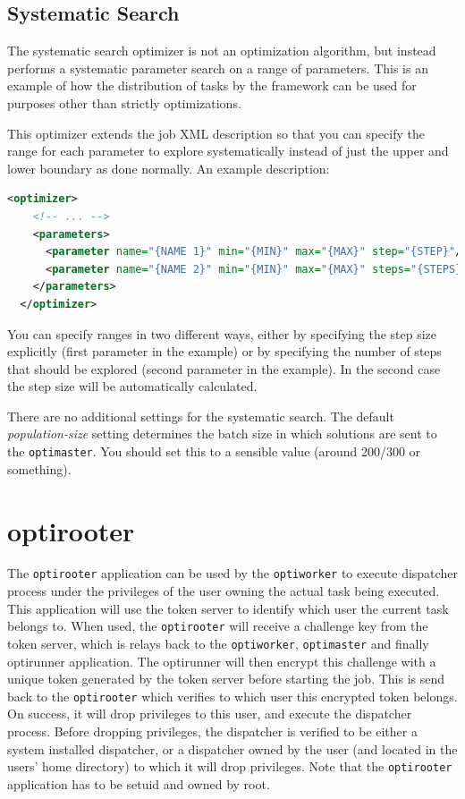 \documentclass{report}
\begin{document}
\subsection{Systematic Search}
The systematic search optimizer is not an optimization algorithm, but instead
performs a systematic parameter search on a range of parameters. This is an
example of how the distribution of tasks by the framework can be used for
purposes other than strictly optimizations.

This optimizer extends the job XML description so that you can specify the
range for each parameter to explore systematically instead of just the upper
and lower boundary as done normally. An example description:

\begin{lstlisting}[language=xml]
  <optimizer>
    <!-- ... -->
    <parameters>
      <parameter name="{NAME 1}" min="{MIN}" max="{MAX}" step="{STEP}"/>
      <parameter name="{NAME 2}" min="{MIN}" max="{MAX}" steps="{STEPS}"/>
    </parameters>
  </optimizer>
\end{lstlisting}

You can specify ranges in two different ways, either by specifying the step
size explicitly (first parameter in the example) or by specifying the number of
steps that should be explored (second parameter in the example). In the second case
the step size will be automatically calculated.

There are no additional settings for the systematic search. The default
\textit{population-size} setting determines the batch size in which
solutions are sent to the \verb!optimaster!. You should set this to a
sensible value (around 200/300 or something).

\section{optirooter}\label{app:optirooter}
The \verb!optirooter! application can be used by the \verb!optiworker! to execute dispatcher
process under the privileges of the user owning the actual task being executed.
This application will use the token server to identify which user the current
task belongs to. When used, the \verb!optirooter! will receive a challenge key from
the token server, which is relays back to the \verb!optiworker!, \verb!optimaster! and
finally optirunner application. The optirunner will then encrypt this challenge
with a unique token generated by the token server before starting the job. This
is send back to the \verb!optirooter! which verifies to which user this encrypted
token belongs. On success, it will drop privileges to this user, and execute
the dispatcher process. Before dropping privileges, the dispatcher is
verified to be either a system installed dispatcher, or a dispatcher owned
by the user (and located in the users' home directory) to which it will
drop privileges. Note that the \verb!optirooter! application has to be setuid and
owned by root.
\end{document}
